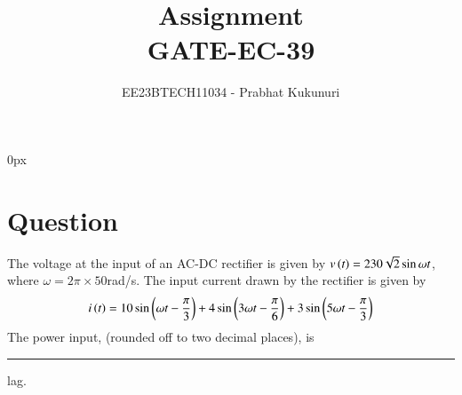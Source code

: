 \documentclass[journal,12pt,twocolumn]{IEEEtran}
\theoremstyle{remark}
\begin{document}
\parindent 0px


\vspace{3cm}

\title{Assignment\\[1ex]GATE-EC-39}
\author{EE23BTECH11034 - Prabhat Kukunuri$^{}$%
}
\maketitle
\newpage
\bigskip

\renewcommand{\thefigure}{\theenumi}
\renewcommand{\thetable}{\theenumi}
\section{Question}
The voltage at the input of an AC-DC rectifier is given by $v\left(t\right)=230\sqrt{2}\sin{\omega t}$, where $\omega=2\pi\times 50$rad/s. The input current drawn by the rectifier is given by
\begin{align*}
    i\left(t\right)=10\sin\left(\omega t-\frac{\pi}{3}\right)+4\sin\left(3\omega t-\frac{\pi}{6}\right)+3\sin\left(5\omega t-\frac{\pi}{3}\right)
\end{align*}
The power input, (rounded off to two decimal places), is\rule{1.5cm}{0.15mm}lag.
\end{document}
